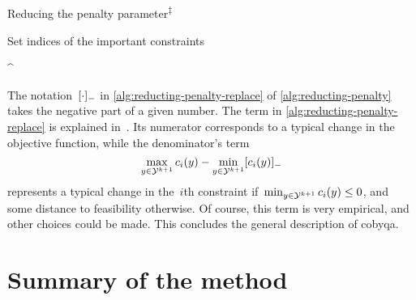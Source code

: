 \begin{algorithm}
    \caption[Reducing the penalty parameter]{Reducing the penalty parameter\textsuperscript{$\ddagger$}}
    \label{alg:reducting-penalty}
    \DontPrintSemicolon
    \onehalfspacing
    Set indices of the important constraints
    \begin{algomathdisplay}
        \iub^{\ast} \eqdef {}
    \end{algomathdisplay}
\end{algorithm}
%

The notation~$[\cdot]_-$ in \cref{alg:reducting-penalty-replace} of \cref{alg:reducting-penalty} takes the negative part of a given number.
The term in \cref{alg:reducting-penalty-replace} is explained in~\cite[\S~4]{Powell_1994}.
Its numerator corresponds to a typical change in the objective function, while the denominator's term
\begin{equation*}
    \max_{y \in \xpt[k + 1]} \con{i}(y) - \min_{y \in \xpt[k + 1]} \negp{\con{i}(y)}
\end{equation*}
represents a typical change in the~$i$th constraint if~$\min_{y \in \xpt[k + 1]} \con{i}(y) \le 0$, and some distance to feasibility otherwise.
Of course, this term is very empirical, and other choices could be made.
This concludes the general description of \gls{cobyqa}.

\section{Summary of the method}


